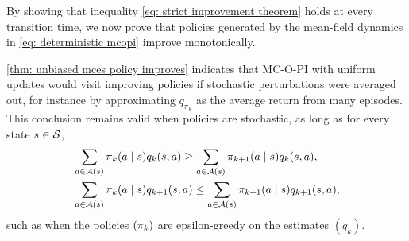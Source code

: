 By showing that inequality \eqref{eq: strict improvement theorem} holds at every transition time, we now prove that policies generated by the mean-field dynamics in \eqref{eq: deterministic mcopi} improve monotonically.




\autoref{thm: unbiased mces policy improves} indicates that 
MC-O-PI with uniform updates would visit improving policies
if stochastic perturbations were averaged out, for instance by approximating $q_{\pi_k}$ as the average return from many episodes.
% 
This conclusion remains valid when policies are stochastic, as long as for every state $s \in \mathcal{S}$,
\begin{align*}
        &\sum_{a \in \mathcal{A}(s)} \pi_k(a \mid s) q_k(s,a) 
        \geq 
        \sum_{a \in \mathcal{A}(s)} \pi_{k+1}(a \mid s) q_k(s,a) ,
        \\
        &\sum_{a \in \mathcal{A}(s)} \pi_k(a \mid s) q_{k+1}(s,a) 
        \leq 
        \sum_{a \in \mathcal{A}(s)} \pi_{k+1}(a \mid s) q_{k+1}(s,a) ,
\end{align*}
such as when the policies $(\pi_k)$ are epsilon-greedy on the estimates $(q_k)$.

% 

